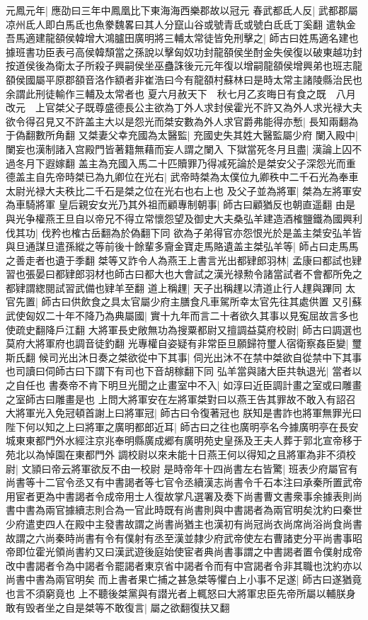 元鳳元年|{
	應劭曰三年中鳳凰比下東海海西樂郡故以冠元}
春武都氐人反|{
	武都郡屬凉州氐人即白馬氐也魚豢魏畧曰其人分竄山谷或號青氐或號白氐氐丁奚翻}
遣執金吾馬適建龍頟侯韓增大鴻臚田廣明將三輔太常徒皆免刑擊之|{
	師古曰姓馬適名建也據班書功臣表弓高侯韓頹當之孫說以擊匈奴功封龍頟侯坐酎金失侯復以破東越功封按道侯後為衛太子所殺子興嗣侯坐巫蠱誅後元元年復以增嗣龍頟侯增興弟也班志龍頟侯國屬平原郡頟音洛作額者非崔浩曰今有龍頟村蘇林曰是時太常主諸陵縣治民也余謂此刑徒輸作三輔及太常者也}
夏六月赦天下　秋七月乙亥晦日有食之既　八月改元　上官桀父子既尊盛德長公主欲為丁外人求封侯霍光不許又為外人求光禄大夫欲令得召見又不許盖主大以是怨光而桀安數為外人求官爵弗能得亦慙|{
	長知兩翻為于偽翻數所角翻}
又桀妻父幸充國為太醫監|{
	充國史失其姓大醫監屬少府}
闌入殿中|{
	闌妄也漢制諸入宫殿門皆著籍無藉而妄人謂之闌入}
下獄當死冬月且盡|{
	漢論上囚不過冬月下遐嫁翻}
盖主為充國入馬二十匹贖罪乃得减死論於是桀安父子深怨光而重德盖主自先帝時桀已為九卿位在光右|{
	武帝時桀為太僕位九卿秩中二千石光為奉車太尉光禄大夫秩比二千石是桀之位在光右也右上也}
及父子並為將軍|{
	桀為左將軍安為車騎將軍}
皇后親安女光乃其外祖而顧專制朝事|{
	師古曰顧猶反也朝直遥翻}
由是與光争權燕王旦自以帝兄不得立常懷怨望及御史大夫桑弘羊建造酒榷鹽鐵為國興利伐其功|{
	伐矜也榷古岳翻為於偽翻下同}
欲為子弟得官亦怨恨光於是盖主桀安弘羊皆與旦通謀旦遣孫縱之等前後十餘輩多齎金寶走馬賂遺盖主桀弘羊等|{
	師占曰走馬馬之善走者也遺于季翻}
桀等又詐令人為燕王上書言光出都肄郎羽林|{
	孟康曰都試也肄習也張晏曰都肄郎羽材也師古曰都大也大會試之漢光禄勲令諸當試者不會都所免之都肄謂緫閱試習武備也肄羊至翻}
道上稱䟆|{
	天子出稱䟆以清道止行人䟆與蹕同}
太官先置|{
	師古曰供飲食之具太官屬少府主膳食凡車駕所幸太官先往其處供置}
又引蘇武使匈奴二十年不降乃為典屬國|{
	實十九年而言二十者欲久其事以見寃屈故言多也使疏史翻降戶江翻}
大將軍長史敞無功為搜粟都尉又擅調益莫府校尉|{
	師古曰調選也莫府大將軍府也調音徒釣翻}
光專權自姿疑有非常臣旦願歸符璽人宿衛察姦臣變|{
	璽斯氏翻}
候司光出沐日奏之桀欲從中下其事|{
	伺光出沐不在禁中桀欲自從禁中下其事也司讀曰伺師古曰下謂下有司也下音胡稼翻下同}
弘羊當與諸大臣共執退光|{
	當者以之自任也}
書奏帝不肯下明旦光聞之止畫室中不入|{
	如淳曰近臣調計畫之室或曰雕畫之室師古曰雕畫是也}
上問大將軍安在左將軍桀對曰以燕王告其罪故不敢入有詔召大將軍光入免冠頓首謝上曰將軍冠|{
	師古曰令復著冠也}
朕知是書詐也將軍無罪光曰陛下何以知之上曰將軍之廣明都郎近耳|{
	師古曰之往也廣明亭名今據廣明亭在長安城東東都門外水經注京兆奉明縣廣成郷有廣明苑史皇孫及王夫人葬于郭北宣帝移于苑北以為悼園在東都門外}
調校尉以來未能十日燕王何以得知之且將軍為非不須校尉|{
	文頴曰帝云將軍欲反不由一校尉}
是時帝年十四尚書左右皆驚|{
	班表少府屬官有尚書等十二官令丞又有中書謁者等七官令丞續漢志尚書令千石本注曰承秦所置武帝用宦者更為中書謁者令成帝用士人復故掌凡選署及奏下尚書曹文書衆事余據表則尚書中書為兩官據續志則合為一官此時既有尚書則與中書謁者為兩官明矣沈約曰秦世少府遣吏四人在殿中主發書故謂之尚書尚猶主也漢初有尚冠尚衣尚席尚浴尚食尚書故謂之六尚秦時尚書有令有僕射有丞至漢並隸少府武帝使左右曹諸吏分平尚書事昭帝即位霍光領尚書約又曰漢武遊後庭始使宦者典尚書事謂之中書謁者置令僕射成帝改中書謁者令為中謁者令罷謁者東京省中謁者令而有中宫謁者令非其職也沈約亦以尚書中書為兩官明矣}
而上書者果亡捕之甚急桀等懼白上小事不足遂|{
	師古曰遂猶竟也言不須窮竟也}
上不聽後桀黨與有譛光者上輒怒曰大將軍忠臣先帝所屬以輔朕身敢有毁者坐之自是桀等不敢復言|{
	屬之欲翻復扶又翻}


